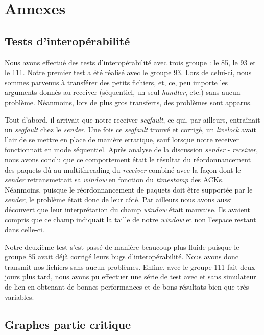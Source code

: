 \documentclass[../main.tex]{subfiles}
\begin{document}
\section{Annexes}
\label{sec:annexes}

\subsection{Tests d'interopérabilité}
\label{sec:interop}

Nous avons effectué des tests d'interopérabilité avec trois groupe : le 85, le 93 et le 111. Notre premier test a été réalisé avec le groupe 93. Lors de celui-ci, 
nous sommes parvenus à transférer des petits fichiers, et, ce, peu importe les arguments donnés au receiver (séquentiel, un seul \textit{handler}, etc.) sans 
aucun problème. Néanmoins, lors de plus gros transferts, des problèmes sont apparus.

Tout d'abord, il arrivait que notre receiver \textit{segfault}, ce qui, par ailleurs, entraînait un \textit{segfault} chez le \textit{sender}.
Une fois ce \textit{segfault} trouvé et corrigé, un \textit{livelock} avait l'air de se mettre en place de manière erratique, sauf lorsque 
notre receiver fonctionnait en mode séquentiel. Après analyse de la discussion \textit{sender} - \textit{receiver}, nous avons conclu
que ce comportement était le résultat du réordonnancement des paquets dû au multithreading du \textit{receiver} combiné avec la façon dont le 
\textit{sender} retransmettait sa \textit{window} en fonction du \textit{timestamp} des ACKs. Néanmoins, puisque le réordonnancement de paquets 
doit être supportée par le \textit{sender}, le problème était donc de leur côté. Par ailleurs nous avons aussi découvert que leur interprétation du 
champ \textit{window} était mauvaise. Ils avaient compris que ce champ indiquait la taille de notre \textit{window} et non l'espace restant dans celle-ci.

Notre deuxième test s'est passé de manière beaucoup plus fluide puisque le groupe 85 avait déjà corrigé leurs bugs d'interopérabilité.
Nous avons donc transmit nos fichiers sans aucun problèmes. Enfine, avec le groupe 111 fait deux jours plus tard, nous avons pu effectuer une série de test
avec et sans simulateur de lien en obtenant de bonnes performances et de bons résultats bien que très variables.

\subsection{Graphes partie critique}
\label{sec:graph_crit}
\end{document}
